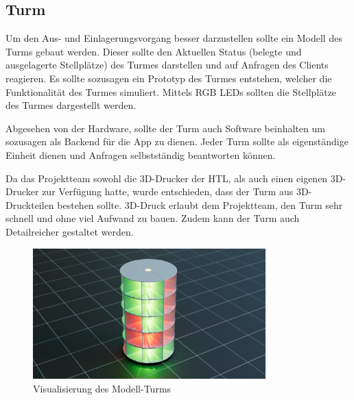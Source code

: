\subsection{Turm}

Um den Aus- und Einlagerungsvorgang besser darzustellen sollte ein Modell des Turms gebaut werden. Dieser sollte den Aktuellen Status (belegte und ausgelagerte Stellplätze) des Turmes darstellen und auf Anfragen des Clients reagieren. Es sollte sozusagen ein Prototyp des Turmes entstehen, welcher die Funktionalität des Turmes simuliert. Mittels RGB LEDs sollten die Stellplätze des Turmes dargestellt werden.

Abgesehen von der Hardware, sollte der Turm auch Software beinhalten um sozusagen als Backend für die App zu dienen. Jeder Turm sollte als eigenständige Einheit dienen und Anfragen selbstständig beantworten können.

Da das Projektteam sowohl die 3D-Drucker der HTL, als auch einen eigenen 3D-Drucker zur Verfügung hatte, wurde entschieden, dass der Turm aus 3D-Druckteilen bestehen sollte. 3D-Druck erlaubt dem Projektteam, den Turm sehr schnell und ohne viel Aufwand zu bauen. Zudem kann der Turm auch Detailreicher gestaltet werden.

\begin{figure}[H]
  \centering
  \includegraphics[width=0.8\textwidth]{images/turm_modell.png}
  \caption{Visualisierung des Modell-Turms}
  \label{fig:turm}
\end{figure}